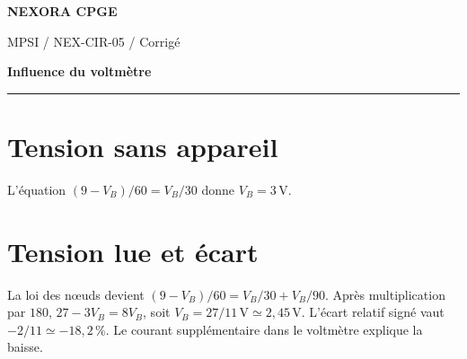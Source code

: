 \documentclass[11pt,a4paper]{article}
\begin{document}
{\small\bfseries\color{nexorablue} NEXORA CPGE}\par
{\small MPSI / NEX-CIR-05 / Corrigé}\par
{\LARGE\bfseries Influence du voltmètre}\par
\vspace{0.25em}\hrule\vspace{0.6em}

\section*{Tension sans appareil}
L’équation $(9-V_B)/60=V_B/30$ donne $V_B=3\,\mathrm V$.

\section*{Tension lue et écart}
La loi des nœuds devient $(9-V_B)/60=V_B/30+V_B/90$. Après multiplication par $180$, $27-3V_B=8V_B$, soit $V_B=27/11\,\mathrm V\simeq2{,}45\,\mathrm V$. L’écart relatif signé vaut $-2/11\simeq-18{,}2\,\%$. Le courant supplémentaire dans le voltmètre explique la baisse.
\end{document}
